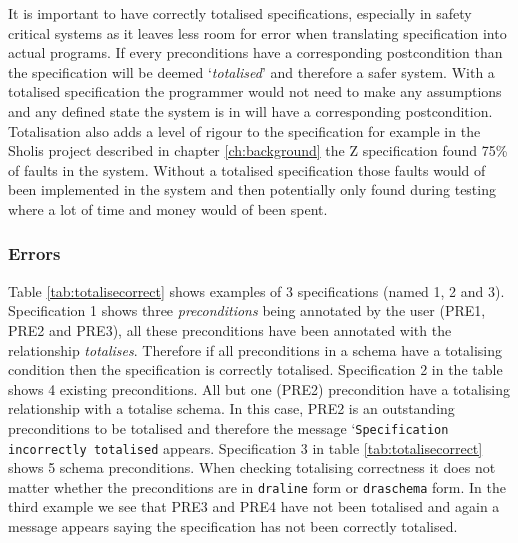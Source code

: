 It is important to have correctly totalised specifications, especially in safety
critical systems as it leaves less room for error when translating specification
into actual programs. If every preconditions have a corresponding postcondition
than the specification will be deemed `\emph{totalised}' and therefore a safer
system. With a totalised specification the programmer would not need to make any
assumptions and any defined state the system is in will have a corresponding
postcondition. Totalisation also adds a level of rigour to the specification for
example in the Sholis project \cite{sholis} described in chapter
\ref{ch:background} the Z specification found 75\% of faults in the system.
Without a totalised specification those faults would of been implemented in the
system and then potentially only found during testing where a lot of time and
money would of been spent.

\subsubsection{Errors}
\label{subsubsec:zdra_toterrors}

Table \ref{tab:totalisecorrect} shows examples of 3 specifications (named 1, 2
and 3). Specification 1 shows three \emph{preconditions} being annotated by the
user (PRE1, PRE2 and PRE3), all these preconditions have been annotated with the
relationship \emph{totalises}. Therefore if all preconditions in a schema have a
totalising condition then the specification is correctly totalised.
Specification 2 in the table shows 4 existing preconditions. All but one (PRE2)
precondition have a totalising relationship with a totalise schema. In this
case, PRE2 is an outstanding preconditions to be totalised and therefore the
message `\texttt{Specification incorrectly totalised} appears. Specification 3 in
table \ref{tab:totalisecorrect} shows 5 schema preconditions. When checking
totalising correctness it does not matter whether the preconditions are in
\verb|draline| form or \verb|draschema| form. In the third example we see that
PRE3 and PRE4 have not been totalised and again a message appears saying the
specification has not been correctly totalised.

